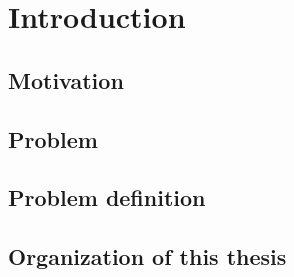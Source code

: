 \chapter{Introduction} \label{ch:intro}
\section{Motivation} 

\section{Problem}

\section{Problem definition}

\section{Organization of this thesis}
